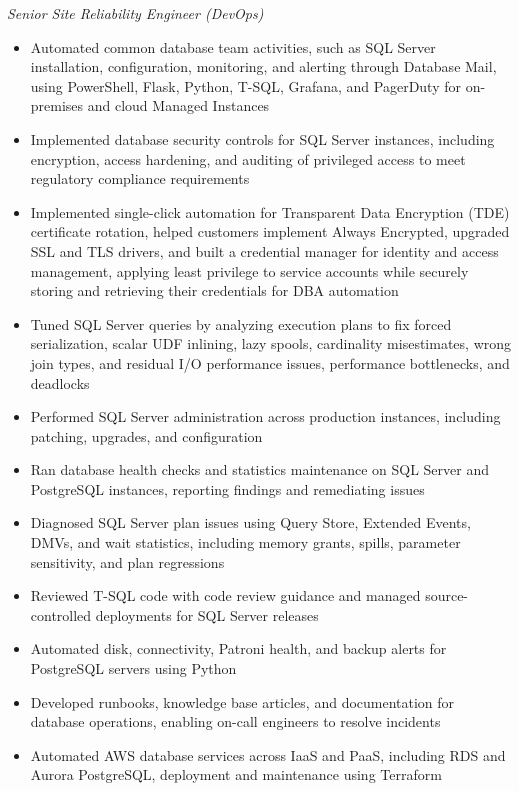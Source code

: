 \documentclass[10pt,a4paper]{article}
\begin{document}
\textit{Senior Site Reliability Engineer (DevOps)}\\[-5pt]
\begin{itemize}
  \item Automated common database team activities, such as SQL Server installation, configuration, monitoring, and alerting through Database Mail, using PowerShell, Flask, Python, T-SQL, Grafana, and PagerDuty for on-premises and cloud Managed Instances
  \item Implemented database security controls for SQL Server instances, including encryption, access hardening, and auditing of privileged access to meet regulatory compliance requirements
  \item Implemented single-click automation for Transparent Data Encryption (TDE) certificate rotation, helped customers implement Always Encrypted, upgraded SSL and TLS drivers, and built a credential manager for identity and access management, applying least privilege to service accounts while securely storing and retrieving their credentials for DBA automation
  \item Tuned SQL Server queries by analyzing execution plans to fix forced serialization, scalar UDF inlining, lazy spools, cardinality misestimates, wrong join types, and residual I/O performance issues, performance bottlenecks, and deadlocks
  \item Performed SQL Server administration across production instances, including patching, upgrades, and configuration
  \item Ran database health checks and statistics maintenance on SQL Server and PostgreSQL instances, reporting findings and remediating issues
  \item Diagnosed SQL Server plan issues using Query Store, Extended Events, DMVs, and wait statistics, including memory grants, spills, parameter sensitivity, and plan regressions
  \item Reviewed T-SQL code with code review guidance and managed source-controlled deployments for SQL Server releases
  \item Automated disk, connectivity, Patroni health, and backup alerts for PostgreSQL servers using Python
  \item Developed runbooks, knowledge base articles, and documentation for database operations, enabling on-call engineers to resolve incidents
  \item Automated AWS database services across IaaS and PaaS, including RDS and Aurora PostgreSQL, deployment and maintenance using Terraform

\end{itemize}
\end{document}
